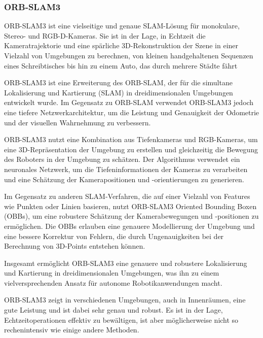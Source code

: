 \cite{bescos2018dynaslam}
\subsubsection{ORB-SLAM3}

ORB-SLAM3 ist eine vielseitige und genaue SLAM-Lösung für monokulare, Stereo- und RGB-D-Kameras. Sie ist in der Lage, in Echtzeit die Kameratrajektorie und eine spärliche 3D-Rekonstruktion der Szene in einer Vielzahl von Umgebungen zu berechnen, von kleinen handgehaltenen Sequenzen eines Schreibtisches bis hin zu einem Auto, das durch mehrere Städte fährt

ORB-SLAM3 ist eine Erweiterung des ORB-SLAM, der für die simultane Lokalisierung und Kartierung (SLAM) in dreidimensionalen Umgebungen entwickelt wurde. Im Gegensatz zu ORB-SLAM verwendet ORB-SLAM3 jedoch eine tiefere Netzwerkarchitektur, um die Leistung und Genauigkeit der Odometrie und der visuellen Wahrnehmung zu verbessern.

ORB-SLAM3 nutzt eine Kombination aus Tiefenkameras und RGB-Kameras, um eine 3D-Repräsentation der Umgebung zu erstellen und gleichzeitig die Bewegung des Roboters in der Umgebung zu schätzen. Der Algorithmus verwendet ein neuronales Netzwerk, um die Tiefeninformationen der Kameras zu verarbeiten und eine Schätzung der Kamerapositionen und -orientierungen zu generieren.

Im Gegensatz zu anderen SLAM-Verfahren, die auf einer Vielzahl von Features wie Punkten oder Linien basieren, nutzt ORB-SLAM3 Oriented Bounding Boxen (OBBs), um eine robustere Schätzung der Kamerabewegungen und -positionen zu ermöglichen. Die OBBs erlauben eine genauere Modellierung der Umgebung und eine bessere Korrektur von Fehlern, die durch Ungenauigkeiten bei der Berechnung von 3D-Points entstehen können.

Insgesamt ermöglicht ORB-SLAM3 eine genauere und robustere Lokalisierung und Kartierung in dreidimensionalen Umgebungen, was ihn zu einem vielversprechenden Ansatz für autonome Robotikanwendungen macht.

ORB-SLAM3 zeigt in verschiedenen Umgebungen, auch in Innenräumen, eine gute Leistung und ist dabei sehr genau und robust. Es ist in der Lage, Echtzeitoperationen effektiv zu bewältigen, ist aber möglicherweise nicht so rechenintensiv wie einige andere Methoden.

\cite{ORBSLAM3TRO}

